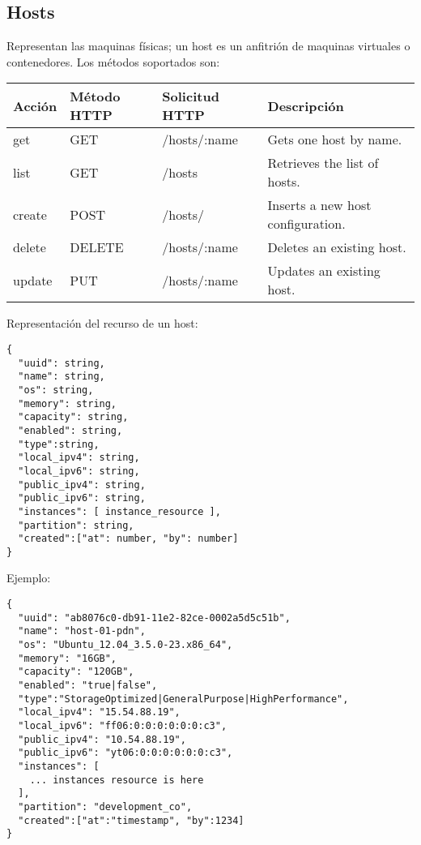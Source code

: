\subsection{Hosts}
Representan las maquinas físicas; un host es un anfitrión de maquinas virtuales o contenedores. Los métodos soportados son:

\begin{center}
 \begin{tabular}{| l | l | l | l |}
 \hline
  \rowcolor{blueapi}
  \textbf{Acción} & \textbf{Método HTTP} & \textbf{Solicitud HTTP} & \textbf{Descripción} \\ [0.5ex] 
  \hline\hline
  get & GET & /hosts/:name & Gets one host by name. \\
  \hline
  list & GET & /hosts & Retrieves the list of hosts. \\
  \hline  
  create & POST & /hosts/ & Inserts a new host configuration. \\
  \hline
  delete & DELETE & /hosts/:name & Deletes an existing host. \\
  \hline  
  update & PUT & /hosts/:name & Updates an existing host. \\ [1ex] 
  \hline
\end{tabular}
\end{center}

Representación del recurso de un host:

\medskip
\begin{lstlisting}[style=json]
{
  "uuid": string,
  "name": string,
  "os": string,
  "memory": string,
  "capacity": string,
  "enabled": string,
  "type":string,
  "local_ipv4": string,
  "local_ipv6": string,
  "public_ipv4": string,
  "public_ipv6": string,
  "instances": [ instance_resource ],
  "partition": string,
  "created":["at": number, "by": number]
}
\end{lstlisting}

Ejemplo:

\medskip
\begin{lstlisting}[style=json]
{
  "uuid": "ab8076c0-db91-11e2-82ce-0002a5d5c51b",
  "name": "host-01-pdn",
  "os": "Ubuntu_12.04_3.5.0-23.x86_64",
  "memory": "16GB",
  "capacity": "120GB",
  "enabled": "true|false",
  "type":"StorageOptimized|GeneralPurpose|HighPerformance",
  "local_ipv4": "15.54.88.19",
  "local_ipv6": "ff06:0:0:0:0:0:0:c3",
  "public_ipv4": "10.54.88.19",
  "public_ipv6": "yt06:0:0:0:0:0:0:c3",
  "instances": [
    ... instances resource is here
  ],
  "partition": "development_co",
  "created":["at":"timestamp", "by":1234]
}
\end{lstlisting}


